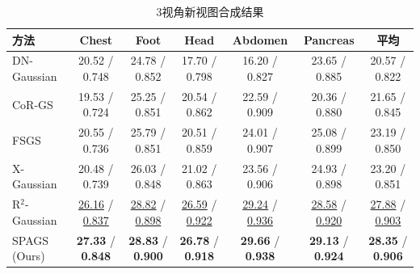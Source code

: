 
\begin{table}[htbp]
    \centering
    \caption{3视角新视图合成结果}
    \label{tab:spags_3view}
    \footnotesize
    \begin{tabular*}{\textwidth}{@{\extracolsep{\fill}}lcccccc@{}}
        \toprule
        方法 & Chest & Foot & Head & Abdomen & Pancreas & 平均 \\
        \midrule
        DN-Gaussian & 20.52 / 0.748 & 24.78 / 0.852 & 17.70 / 0.798 & 16.20 / 0.827 & 23.65 / 0.885 & 20.57 / 0.822 \\
        CoR-GS & 19.53 / 0.724 & 25.25 / 0.851 & 20.54 / 0.862 & 22.59 / 0.909 & 20.36 / 0.880 & 21.65 / 0.845 \\
        FSGS & 20.55 / 0.736 & 25.79 / 0.851 & 20.51 / 0.859 & 24.01 / 0.907 & 25.08 / 0.899 & 23.19 / 0.850 \\
        X-Gaussian & 20.48 / 0.739 & 26.03 / 0.848 & 21.02 / 0.863 & 23.56 / 0.906 & 24.93 / 0.898 & 23.20 / 0.851 \\
        R$^2$-Gaussian & \underline{26.16} / \underline{0.837} & \underline{28.82} / \underline{0.898} & \underline{26.59} / \underline{0.922} & \underline{29.24} / \underline{0.936} & \underline{28.58} / \underline{0.920} & \underline{27.88} / \underline{0.903} \\
        SPAGS (Ours) & \textbf{27.33} / \textbf{0.848} & \textbf{28.83} / \textbf{0.900} & \textbf{26.78} / \textbf{0.918} & \textbf{29.66} / \textbf{0.938} & \textbf{29.13} / \textbf{0.924} & \textbf{28.35} / \textbf{0.906} \\
        \bottomrule
    \end{tabular*}
\end{table}

